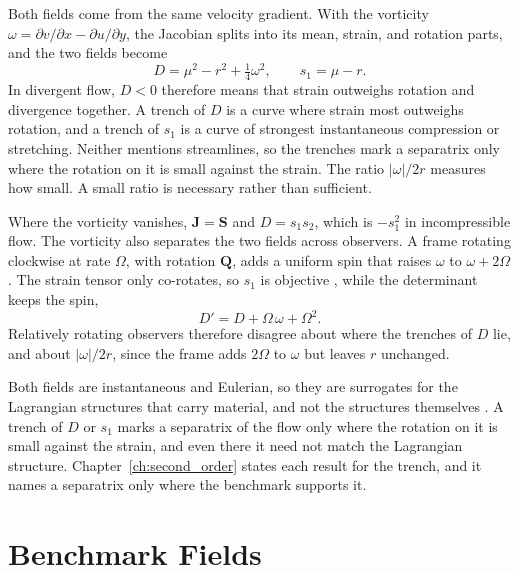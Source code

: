Both fields come from the same velocity gradient. With the vorticity
$\omega = \partial v/\partial x - \partial u/\partial y$, the Jacobian
splits into its mean, strain, and rotation parts, and the two fields become
\begin{equation}
    D = \mu^2 - r^2 + \tfrac{1}{4}\omega^2, \qquad s_1 = \mu - r.
    \label{eq:ch3:D_parts}
\end{equation}
In divergent flow, $D < 0$ therefore means that strain outweighs rotation
and divergence together. A trench of $D$ is a curve where strain most
outweighs rotation, and a trench of $s_1$ is a curve of strongest
instantaneous compression or stretching. Neither mentions streamlines, so
the trenches mark a separatrix only where the rotation on it is small
against the strain. The ratio $|\omega|/2r$ measures how small. A small
ratio is necessary rather than sufficient.

Where the vorticity vanishes, $\mathbf{J} = \mathbf{S}$ and
$D = s_1 s_2$, which is $-s_1^2$ in incompressible flow. The vorticity
also separates the two fields across observers. A frame rotating clockwise
at rate
$\Omega$, with rotation $\mathbf{Q}$, adds a uniform spin that raises
$\omega$ to $\omega + 2\Omega$. The strain tensor only co-rotates, so
$s_1$ is objective \cite{49}, while the determinant keeps the spin,
\begin{equation}
    D' = D + \Omega\,\omega + \Omega^2 .
    \label{eq:ch3:D_not_objective}
\end{equation}
Relatively rotating observers therefore disagree about where the
trenches of $D$ lie, and about $|\omega|/2r$, since the frame adds $2\Omega$
to $\omega$ but leaves $r$ unchanged.

Both fields are instantaneous and Eulerian, so they are surrogates for the
Lagrangian structures that carry material, and not the structures
themselves \cite{51}. A trench of $D$ or $s_1$ marks a separatrix of
the flow only where the rotation on it is small against the strain, and
even there it need not match the Lagrangian structure. Chapter~\ref{ch:second_order}
states each result for the trench, and it names a separatrix only where the
benchmark supports it.

\section{Benchmark Fields}
\label{sec:ch3:benchmarks}

